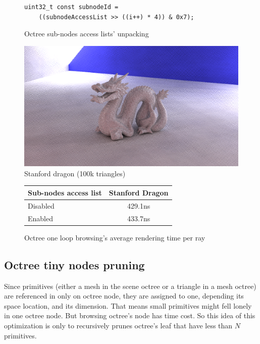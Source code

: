 \documentclass[10pt,twocolumn,a4paper]{article}
\begin{document}
\begin{figure}[H]
    \centering
    \begin{lstlisting}[morekeywords={uint32_t}]
uint32_t const subnodeId =
    ((subnodeAccessList >> ((i++) * 4)) & 0x7);
    \end{lstlisting}
    \caption{Octree sub-nodes access lists' unpacking}
    \label{code:subnode_access_unpacking}
\end{figure}

\begin{figure}[h]
    \centering
    \includegraphics[width=0.8\columnwidth]{render_stanford_dragon.png}
    \caption{Stanford dragon (100k triangles)}
    \label{fig:stanford_dragon}
\end{figure}

\begin{figure}[H]
    \tiny
    \centering
    \begin{tabular}{ | l | c | }
        \hline
        Sub-nodes access list & Stanford Dragon \\
        \hline
        Disabled & 429.1ns \\
        Enabled & 433.7ns \\
        \hline
    \end{tabular}
    \caption{Octree one loop browsing's average rendering time per ray}
    \label{table:octree_one_loop_browsing}
\end{figure}


\subsection{Octree tiny nodes pruning}
Since primitives (either a mesh in the scene octree or a triangle in a mesh
octree) are referenced in only on octree node, they are assigned to one,
depending its space location, and its dimension. That means small primitives
might fell lonely in one octree node. But browsing octree's node has time cost.
So this idea of this optimization is only to recursively prunes octree's leaf
that have less than $N$ primitives.
\end{document}
